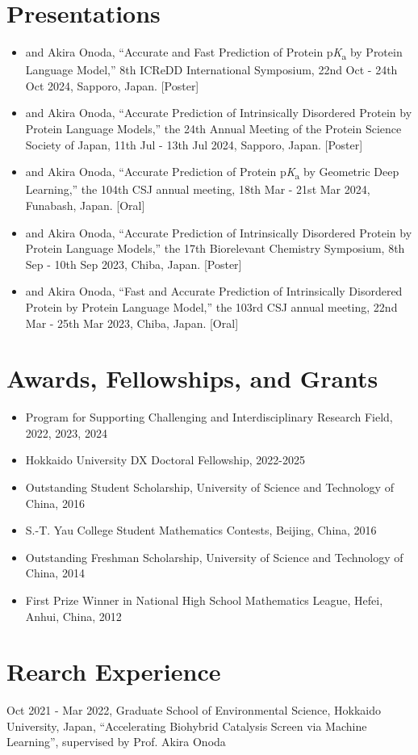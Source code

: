 \documentclass[a4paper,11pt]{article}
\newcommand{\pKa}{p\textit{K}\textsubscript{a}}
\begin{document}
\section*{Presentations}
\begin{itemize}
    \item {} and Akira Onoda, ``Accurate and Fast Prediction of Protein \pKa{} by Protein Language Model,'' 8th ICReDD International Symposium, 22nd Oct - 24th Oct 2024, Sapporo, Japan. [Poster]
    \item {} and Akira Onoda, ``Accurate Prediction of Intrinsically Disordered Protein by Protein Language Models,'' the 24th Annual Meeting of the Protein Science Society of Japan, 11th Jul - 13th Jul 2024, Sapporo, Japan. [Poster]
    \item {} and Akira Onoda, ``Accurate Prediction of Protein \pKa{} by Geometric Deep Learning,'' the 104th CSJ annual meeting, 18th Mar - 21st Mar 2024, Funabash, Japan. [Oral]
    \item {} and Akira Onoda, ``Accurate Prediction of Intrinsically Disordered Protein by Protein Language Models,'' the 17th Biorelevant Chemistry Symposium, 8th Sep - 10th Sep 2023, Chiba, Japan. [Poster]
    \item {} and Akira Onoda, ``Fast and Accurate Prediction of Intrinsically Disordered Protein by Protein Language Model,'' the 103rd CSJ annual meeting, 22nd Mar - 25th Mar 2023, Chiba, Japan. [Oral] 
\end{itemize}
\section*{Awards, Fellowships, and Grants}
\begin{itemize}
    \item Program for Supporting Challenging and Interdisciplinary Research Field, 2022, 2023, 2024
    \item Hokkaido University DX Doctoral Fellowship, 2022-2025
    \item Outstanding Student Scholarship, University of Science and Technology of China, 2016
    \item S.-T. Yau College Student Mathematics Contests, Beijing, China, 2016
    \item Outstanding Freshman Scholarship, University of Science and Technology of China, 2014
    \item First Prize Winner in National High School Mathematics League, Hefei, Anhui, China, 2012
\end{itemize}

\section*{Rearch Experience}
Oct 2021 - Mar 2022, Graduate School of Environmental Science, Hokkaido University, Japan, ``Accelerating Biohybrid Catalysis Screen via Machine Learning'', supervised by Prof. Akira Onoda\\
\end{document}
